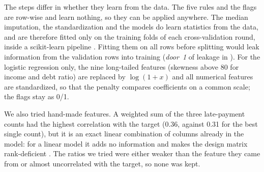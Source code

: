The steps differ in whether they learn from the data. The five rules and the
flags are row-wise and learn nothing, so they can be applied anywhere. The
median imputation, the standardization and the models do learn statistics
from the data, and are therefore fitted only on the training folds of each
cross-validation round, inside a scikit-learn pipeline
\citep{pedregosa2011scikit}. Fitting them on all rows before splitting would
leak information from the validation rows into training (\emph{door~1} of
leakage in \citealp{oku2026slides}). For the logistic regression only, the
nine long-tailed features (skewness above 80 for income and debt ratio) are
replaced by $\log(1+x)$ and all numerical features are standardized, so that
the penalty compares coefficients on a common scale; the flags stay as 0/1.

We also tried hand-made features. A weighted sum of the three late-payment
counts had the highest correlation with the target (0.36, against 0.31 for the
best single count), but it is an exact linear combination of columns already
in the model: for a linear model it adds no information and makes the design
matrix rank-deficient \citep{oku2026slides}. The ratios we tried were either
weaker than the feature they came from or almost uncorrelated with the
target, so none was kept.
